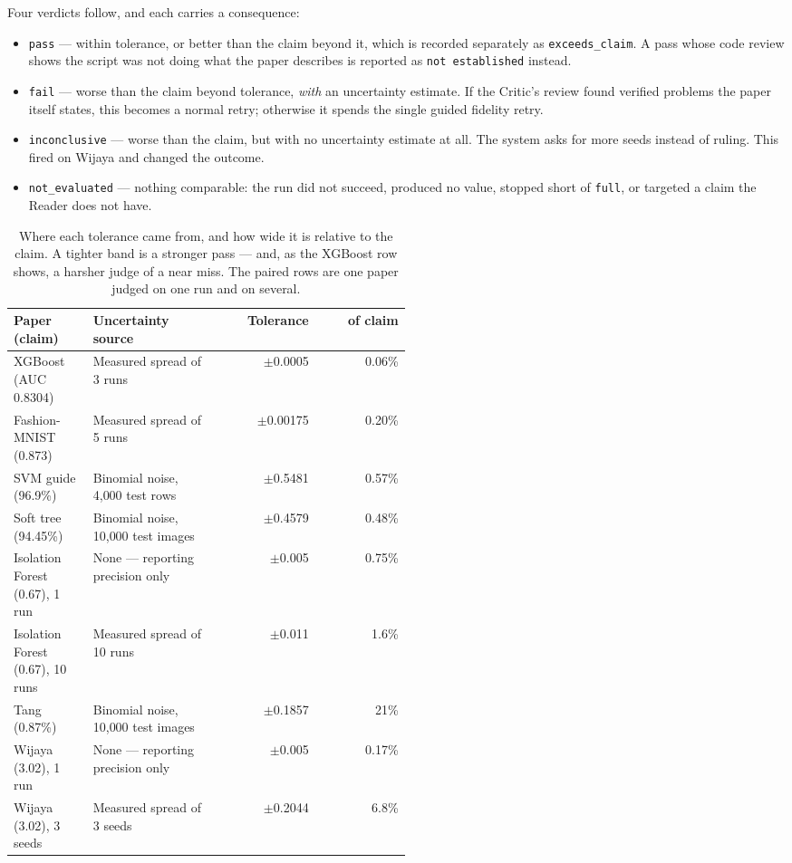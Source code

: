 \documentclass[11pt]{article}
\newcommand{\squeeze}{\setlength{\tabcolsep}{4pt}}
\begin{document}
Four verdicts follow, and each carries a consequence:

\begin{itemize}
  \item \texttt{pass} --- within tolerance, or better than the claim beyond it, which is recorded
    separately as \texttt{exceeds\_claim}. A pass whose code review shows the script was not
    doing what the paper describes is reported as \texttt{not established} instead.
  \item \texttt{fail} --- worse than the claim beyond tolerance, \emph{with} an uncertainty
    estimate. If the Critic's review found verified problems the paper itself states, this becomes
    a normal retry; otherwise it spends the single guided fidelity retry.
  \item \texttt{inconclusive} --- worse than the claim, but with no uncertainty estimate at all.
    The system asks for more seeds instead of ruling. This fired on Wijaya and changed the
    outcome.
  \item \texttt{not\_evaluated} --- nothing comparable: the run did not succeed, produced no value,
    stopped short of \texttt{full}, or targeted a claim the Reader does not have.
\end{itemize}

\begin{table}[tbp]
\centering
\small
\caption{Where each tolerance came from, and how wide it is relative to the claim. A tighter band
is a stronger pass --- and, as the XGBoost row shows, a harsher judge of a near miss. The paired
rows are one paper judged on one run and on several.}
\label{tab:tolerance}
\squeeze
\begin{tabular}{L{0.2\linewidth}L{0.31\linewidth}rr}
\toprule
Paper (claim) & Uncertainty source & Tolerance & of claim \\
\midrule
XGBoost (AUC 0.8304) & Measured spread of 3 runs & $\pm$0.0005 & 0.06\% \\
Fashion-MNIST (0.873) & Measured spread of 5 runs & $\pm$0.00175 & 0.20\% \\
SVM guide (96.9\%) & Binomial noise, 4{,}000 test rows & $\pm$0.5481 & 0.57\% \\
Soft tree (94.45\%) & Binomial noise, 10{,}000 test images & $\pm$0.4579 & 0.48\% \\
Isolation Forest (0.67), 1 run & None --- reporting precision only & $\pm$0.005 & 0.75\% \\
Isolation Forest (0.67), 10 runs & Measured spread of 10 runs & $\pm$0.011 & 1.6\% \\
Tang (0.87\%) & Binomial noise, 10{,}000 test images & $\pm$0.1857 & 21\% \\
Wijaya (3.02), 1 run & None --- reporting precision only & $\pm$0.005 & 0.17\% \\
Wijaya (3.02), 3 seeds & Measured spread of 3 seeds & $\pm$0.2044 & 6.8\% \\
\bottomrule
\end{tabular}
\end{table}
\end{document}
